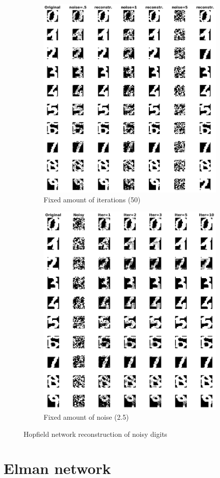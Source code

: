 \documentclass[11pt, a4paper]{article}
\begin{document}
\begin{figure}[H]
    \centering
    \begin{subfigure}{.5\textwidth}
      \centering
      \includegraphics[width=0.90\linewidth]{ndigits_fi1.png}
      \caption{Fixed amount of iterations (50)}
      \label{fig:ndigits1}
    \end{subfigure}%
    \begin{subfigure}{.5\textwidth}
      \centering
      \includegraphics[width=0.85\linewidth]{ndigits_fn2.png}
      \caption{Fixed amount of noise (2.5)}
      \label{fig:ndigits2}
    \end{subfigure}
    \caption{Hopfield network reconstruction of noisy digits}
    \label{fig:ndigit}
\end{figure}

\section{Elman network}

 

\end{document}
